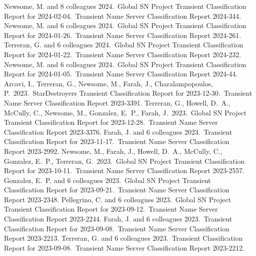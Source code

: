\documentclass[margin,line]{res}
\begin{document}
\begin{resume}
 Newsome, M. and 8 colleagues 2024.\ Global SN Project Transient Classification Report for 2024-02-04.\ Transient Name Server Classification Report 2024-344.
 Newsome, M. and 6 colleagues 2024.\ Global SN Project Transient Classification Report for 2024-01-26.\ Transient Name Server Classification Report 2024-261.
 Terreran, G. and 6 colleagues 2024.\ Global SN Project Transient Classification Report for 2024-01-22.\ Transient Name Server Classification Report 2024-232.
 Newsome, M. and 6 colleagues 2024.\ Global SN Project Transient Classification Report for 2024-01-05.\ Transient Name Server Classification Report 2024-44.
 Arcavi, I., Terreran, G., Newsome, M., Farah, J., Charalampopoulos, P.\ 2023.\ StarDestroyers Transient Classification Report for 2023-12-30.\ Transient Name Server Classification Report 2023-3391.
 Terreran, G., Howell, D.~A., McCully, C., Newsome, M., Gonzalez, E.~P., Farah, J.\ 2023.\ Global SN Project Transient Classification Report for 2023-12-28.\ Transient Name Server Classification Report 2023-3376.
 Farah, J. and 6 colleagues 2023.\ Transient Classification Report for 2023-11-17.\ Transient Name Server Classification Report 2023-2992.
 Newsome, M., Farah, J., Howell, D.~A., McCully, C., Gonzalez, E.~P., Terreran, G.\ 2023.\ Global SN Project Transient Classification Report for 2023-10-11.\ Transient Name Server Classification Report 2023-2557.
 Gonzalez, E.~P. and 6 colleagues 2023.\ Global SN Project Transient Classification Report for 2023-09-21.\ Transient Name Server Classification Report 2023-2348.
 Pellegrino, C. and 6 colleagues 2023.\ Global SN Project Transient Classification Report for 2023-09-12.\ Transient Name Server Classification Report 2023-2244.
 Farah, J. and 6 colleagues 2023.\ Transient Classification Report for 2023-09-08.\ Transient Name Server Classification Report 2023-2213.
 Terreran, G. and 6 colleagues 2023.\ Transient Classification Report for 2023-09-08.\ Transient Name Server Classification Report 2023-2212.

\end{resume}
\end{document}
